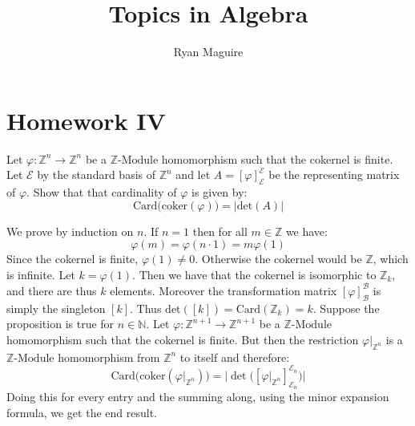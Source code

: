 \documentclass[crop=false,class=article]{standalone}                           %
\begin{document}
    \title{Topics in Algebra}
    \author{Ryan Maguire}
    \date{\vspace{-5ex}}
    \maketitle
    \section{Homework IV}
        \begin{problem}
            Let $\varphi:\mathbb{Z}^{n}\rightarrow\mathbb{Z}^{n}$ be a
            $\mathbb{Z}\textrm{-Module}$ homomorphism such that the cokernel is
            finite. Let $\mathscr{E}$ by the standard basis of $\mathbb{Z}^{n}$
            and let $A=[\varphi]_{\mathscr{E}}^{\mathscr{E}}$ be the
            representing matrix of $\varphi$. Show that that cardinality of
            $\varphi$ is given by:
            \begin{equation}
                \textrm{Card}\big(\textrm{coker}(\varphi)\big)=|\textrm{det}(A)|
            \end{equation}
        \end{problem}
        \begin{solution}
            We prove by induction on $n$. If $n=1$ then for all $m\in\mathbb{Z}$
            we have:
            \begin{equation}
                \varphi(m)=\varphi(n\cdot{1})=m\varphi(1)
            \end{equation}
            Since the cokernel is finite, $\varphi(1)\ne{0}$. Otherwise the
            cokernel would be $\mathbb{Z}$, which is infinite. Let
            $k=\varphi(1)$. Then we have that the cokernel is isomorphic to
            $\mathbb{Z}_{k}$, and there are thus $k$ elements. Moreover the
            transformation matrix $[\varphi]_{\mathscr{B}}^{\mathscr{B}}$ is
            simply the singleton $[k]$. Thus
            $\textrm{det}([k])=\textrm{Card}(\mathbb{Z}_{k})=k$. Suppose the
            proposition is true for $n\in\mathbb{N}$. Let
            $\varphi:\mathbb{Z}^{n+1}\rightarrow\mathbb{Z}^{n+1}$ be a
            $\mathbb{Z}\textrm{-Module}$ homomorphism such that the cokernel is
            finite. But then the restriction $\varphi|_{\mathbb{Z}^{n}}$ is a
            $\mathbb{Z}\textrm{-Module}$ homomorphism from $\mathbb{Z}^{n}$ to
            itself and therefore:
            \begin{equation}
                \textrm{Card}\big(\textrm{coker}(\varphi|_{\mathbb{Z}^{n}})\big)
                =\big|\det\big([\varphi|_{\mathbb{Z}^{n}}
                    ]_{\mathscr{E}_{n}}^{\mathscr{E}_{n}}\big)\big|
            \end{equation}
            Doing this for every entry and the summing along, using the minor
            expansion formula, we get the end result.
        \end{solution}
\end{document}

